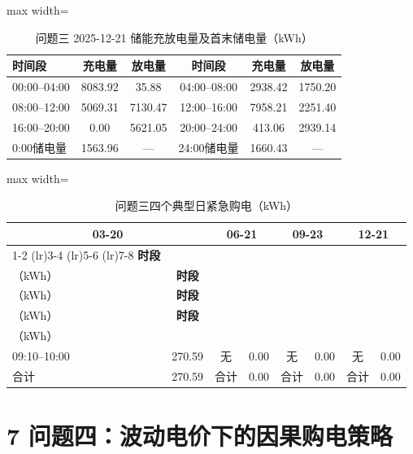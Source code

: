 \documentclass[UTF8,a4paper,zihao=-4,fontset=windows]{ctexart}
\begin{document}
\begin{table}[H]\centering
\fontsize{9.5}{12}\selectfont\setlength{\tabcolsep}{4pt}\renewcommand{\arraystretch}{1.12}
\begin{adjustbox}{max width=\linewidth}\begin{tabular}{lccccc}\toprule
\textbf{时间段} & \textbf{充电量} & \textbf{放电量} & \textbf{时间段} & \textbf{充电量} & \textbf{放电量}\\\midrule
00:00–04:00 & 8083.92 & 35.88 & 04:00–08:00 & 2938.42 & 1750.20\\
08:00–12:00 & 5069.31 & 7130.47 & 12:00–16:00 & 7958.21 & 2251.40\\
16:00–20:00 & 0.00 & 5621.05 & 20:00–24:00 & 413.06 & 2939.14\\
0:00储电量 & 1563.96 & — & 24:00储电量 & 1660.43 & —\\
\bottomrule\end{tabular}\end{adjustbox}
\caption{问题三 2025-12-21 储能充放电量及首末储电量（kWh）}
\end{table}
\begin{table}[H]\centering
\fontsize{9.5}{12}\selectfont\setlength{\tabcolsep}{4pt}\renewcommand{\arraystretch}{1.12}
\begin{adjustbox}{max width=\linewidth}\begin{tabular}{lccccccc}\toprule
\multicolumn{2}{c}{\textbf{03-20}} & \multicolumn{2}{c}{\textbf{06-21}} & \multicolumn{2}{c}{\textbf{09-23}} & \multicolumn{2}{c}{\textbf{12-21}}\\
\cmidrule(lr){1-2} \cmidrule(lr){3-4} \cmidrule(lr){5-6} \cmidrule(lr){7-8}
\textbf{时段} & \shortstack{\textbf{购电量}\\{\normalfont （kWh）}} & \textbf{时段} & \shortstack{\textbf{购电量}\\{\normalfont （kWh）}} & \textbf{时段} & \shortstack{\textbf{购电量}\\{\normalfont （kWh）}} & \textbf{时段} & \shortstack{\textbf{购电量}\\{\normalfont （kWh）}}\\\midrule
09:10–10:00 & 270.59 & 无 & 0.00 & 无 & 0.00 & 无 & 0.00\\
合计 & 270.59 & 合计 & 0.00 & 合计 & 0.00 & 合计 & 0.00\\
\bottomrule\end{tabular}\end{adjustbox}
\caption{问题三四个典型日紧急购电（kWh）}
\end{table}
\section{7 问题四：波动电价下的因果购电策略}
\end{document}
